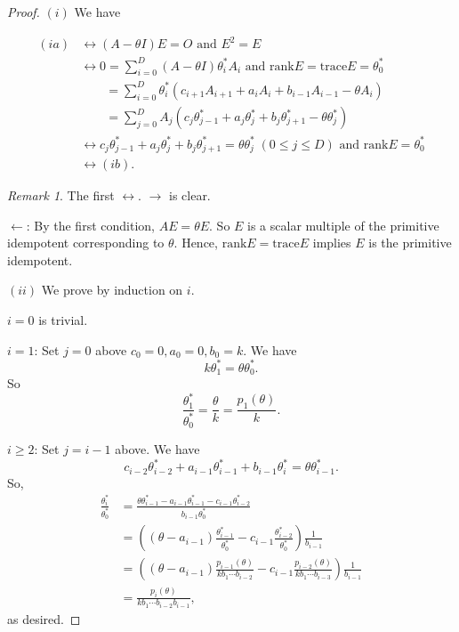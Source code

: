 \documentclass[
]{book}
\theoremstyle{definition}
\theoremstyle{definition}
\theoremstyle{definition}
\theoremstyle{definition}
\theoremstyle{remark}
\newtheorem*{remark}{Remark}
\begin{document}
\begin{proof}
\leavevmode

\((i)\) We have

\begin{align}
(ia) & \leftrightarrow (A- \theta I)E = O \text{ and } E^2 = E\\
& \leftrightarrow 0 = \sum_{i=0}^D(A-\theta I)\theta^*_i A_i \text{ and $\mathrm{rank}E = \mathrm{trace}E = \theta^*_0$}\\
& \qquad = \sum_{i=0}^D\theta^*_i(c_{i+1}A_{i+1}+ a_iA_i + b_{i-1}A_{i-1}-\theta A_i)\\
& \qquad = \sum_{j=0}^D A_j(c_j\theta^*_{j-1}+a_j\theta^*_j+b_j\theta^*_{j+1}-\theta \theta^*_j)\\
& \leftrightarrow c_j \theta^*_{j-1} + a_j\theta^*_j + b_j\theta^*_{j+1} = \theta \theta^*_j \; (0\leq j \leq D) \text{ and }\mathrm{rank}E = \theta^*_0\\
& \leftrightarrow (ib).
\end{align}

\begin{remark}
The first \(\leftrightarrow\). \(\rightarrow\) is clear.

\(\leftarrow\): By the first condition, \(AE = \theta E\). So \(E\) is a scalar multiple of the primitive idempotent corresponding to \(\theta\). Hence, \(\mathrm{rank}E = \mathrm{trace}E\) implies \(E\) is the primitive idempotent.
\end{remark}

\((ii)\) We prove by induction on \(i\).

\(i = 0\) is trivial.

\(i=1\): Set \(j = 0\) above \(c_0 = 0, a_0 = 0, b_0 = k\). We have
\[k\theta^*_1 = \theta \theta^*_0.\]
So
\[\frac{\theta^*_1}{\theta^*_0} = \frac{\theta}{k} = \frac{p_1(\theta)}{k}.\]

\(i\geq 2\): Set \(j=i-1\) above. We have
\[c_{i-2}\theta^*_{i-2} + a_{i-1}\theta^*_{i-1} + b_{i-1}\theta^*_i = \theta \theta^*_{i-1}.\]
So,
\begin{align}
\frac{\theta^*_i}{\theta^*_0} & = \frac{\theta\theta^*_{i-1}-a_{i-1}\theta^*_{i-1}-c_{i-1}\theta^*_{i-2}}{b_{i-1}\theta^*_0}\\
& = \left((\theta-a_{i-1})\frac{\theta^*_{i-1}}{\theta^*_0}-c_{i-1}\frac{\theta^*_{i-2}}{\theta^*_0}\right)\frac{1}{b_{i-1}}\\
& = \left((\theta-a_{i-1})\frac{p_{i-1}(\theta)}{kb_1\cdots b_{i-2}}-c_{i-1}\frac{p_{i-2}(\theta)}{kb_1\cdots b_{i-3}}\right)\frac{1}{b_{i-1}}\\
& = \frac{p_i(\theta)}{kb_1\cdots b_{i-2}b_{i-1}},
\end{align}
as desired.

\end{proof}
\end{document}
